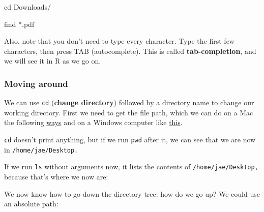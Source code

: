 \documentclass[
  letterpaper,
  DIV=11,
  numbers=noendperiod]{scrreprt}
\newenvironment{Shaded}{\begin{snugshade}}{\end{snugshade}}
\newcommand{\BuiltInTok}[1]{\textcolor[rgb]{0.00,0.23,0.31}{#1}}
\newcommand{\ExtensionTok}[1]{\textcolor[rgb]{0.00,0.23,0.31}{#1}}
\newcommand{\FunctionTok}[1]{\textcolor[rgb]{0.28,0.35,0.67}{#1}}
\newcommand{\NormalTok}[1]{\textcolor[rgb]{0.00,0.23,0.31}{#1}}
\newcommand{\PreprocessorTok}[1]{\textcolor[rgb]{0.68,0.00,0.00}{#1}}
\begin{document}
\begin{Shaded}
\begin{Highlighting}[]
\BuiltInTok{cd}\NormalTok{ Downloads/ }

\FunctionTok{find} \PreprocessorTok{*}\NormalTok{.pdf}
\end{Highlighting}
\end{Shaded}

Also, note that you don't need to type every character. Type the first
few characters, then press TAB (autocomplete). This is called
\textbf{tab-completion}, and we will see it in R as we go on.

\hypertarget{moving-around}{%
\subsubsection*{Moving around}\label{moving-around}}

We can use \texttt{cd} (\textbf{change directory}) followed by a
directory name to change our working directory. First we need to get the
file path, which we can do on a Mac the following
\href{https://setapp.com/how-to/how-to-find-the-path-of-a-file-in-mac}{ways}
and on a Windows computer like
\href{https://www.howtogeek.com/670447/how-to-copy-the-full-path-of-a-file-on-windows-10/}{this}.

\begin{Shaded}
\end{Shaded}

\texttt{cd} doesn't print anything, but if we run \texttt{pwd} after it,
we can see that we are now in \texttt{/home/jae/Desktop.}

If we run \texttt{ls} without arguments now, it lists the contents of
\texttt{/home/jae/Desktop,} because that's where we now are:

\begin{Shaded}
\end{Shaded}

We now know how to go down the directory tree: how do we go up? We could
use an absolute path:

\begin{Shaded}
\end{Shaded}
\end{document}
